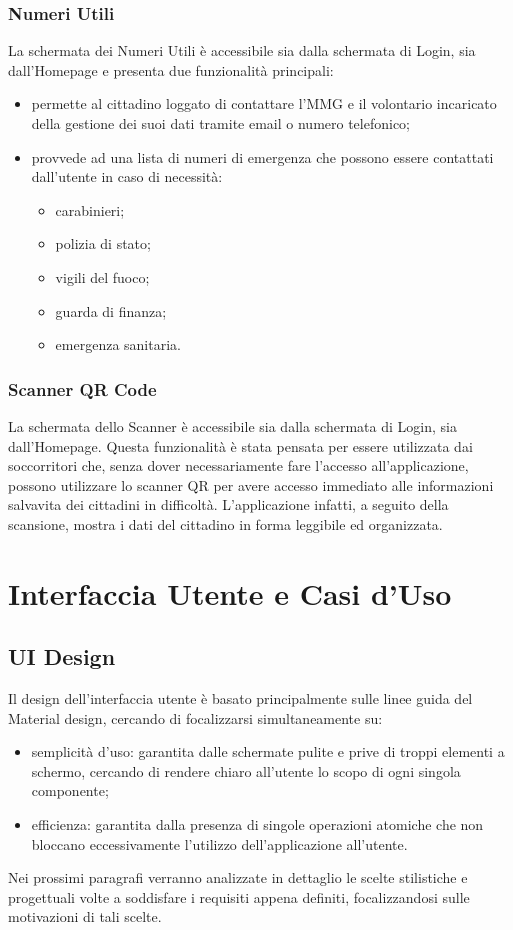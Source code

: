 \documentclass[12pt,a4paper,twoside,openright,titlepage]{book}
\begin{document}
\subsection{Numeri Utili}
La schermata dei Numeri Utili è accessibile sia dalla schermata di Login, sia dall'Homepage e presenta due funzionalità principali:
\begin{itemize}
\item permette al cittadino loggato di contattare l'MMG e il volontario incaricato della gestione dei suoi dati tramite email o numero telefonico;
\item provvede ad una lista di numeri di emergenza che possono essere contattati dall'utente in caso di necessità:
\begin{itemize}
\item carabinieri;
\item polizia di stato;
\item vigili del fuoco;
\item guarda di finanza;
\item emergenza sanitaria.
\end{itemize}
\end{itemize}

\subsection{Scanner QR Code}
La schermata dello Scanner è accessibile sia dalla schermata di Login, sia dall'Homepage. Questa funzionalità è stata pensata per essere utilizzata dai soccorritori che, senza dover necessariamente fare l'accesso all'applicazione, possono utilizzare lo scanner QR per avere accesso immediato alle informazioni salvavita dei cittadini in difficoltà. L'applicazione infatti, a seguito della scansione, mostra i dati del cittadino in forma leggibile ed organizzata.

\chapter{Interfaccia Utente e Casi d'Uso}
\section{UI Design}
Il design dell'interfaccia utente è basato principalmente sulle linee guida del Material design, cercando di focalizzarsi simultaneamente su:
\begin{itemize}
\item semplicità d'uso: garantita dalle schermate pulite e prive di troppi elementi a schermo, cercando di rendere chiaro all'utente lo scopo di ogni singola componente;
\item efficienza: garantita dalla presenza di singole operazioni atomiche che non bloccano eccessivamente l'utilizzo dell'applicazione all'utente.
\end{itemize}
Nei prossimi paragrafi verranno analizzate in dettaglio le scelte stilistiche e progettuali volte a soddisfare i requisiti appena definiti, focalizzandosi sulle motivazioni di tali scelte.
\end{document}
